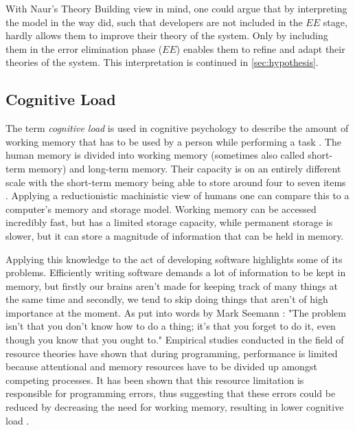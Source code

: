With Naur's Theory Building view in mind, one could argue that by interpreting the model in the way \citeauthor{northover_agile_2007} did, such that developers are not included in the $EE$ stage, hardly allows them to improve their theory of the system.
Only by including them in the error elimination phase ($EE$) enables them to refine and adapt their theories of the system.
This interpretation is continued in \ref{sec:hypothesis}.


\subsection{Cognitive Load}
\label{sec:cognitive-load}
The term \emph{cognitive load} is used in cognitive psychology to describe the amount of working memory that has to be used by a person while performing a task \cite{shaw_memory_2016}.
The human memory is divided into working memory (sometimes also called short-term memory) and long-term memory.
Their capacity is on an entirely different scale \cite{seemann_code_2021} with the short-term memory being able to store around four to seven items \cite{shaw_memory_2016}.
Applying a reductionistic machinistic view of humans one can compare this to a computer's memory and storage model.
Working memory can be accessed incredibly fast, but has a limited storage capacity, while permanent storage is slower, but it can store a magnitude of information that can be held in memory.

Applying this knowledge to the act of developing software highlights some of its problems.
Efficiently writing software demands a lot of information to be kept in memory, but firstly our brains aren't made for keeping track of many things at the same time and secondly, we tend to skip doing things that aren't of high importance at the moment.
As put into words by Mark Seemann \cite{seemann_code_2021}: "The problem isn't that you don't know how to do a thing; it's that you forget to do it, even though you know that you ought to."
Empirical studies conducted in the field of resource theories \cite{ormerod_human_1990} have shown that during programming, performance is limited because attentional and memory resources have to be divided up amongst competing processes.
It has been shown that this resource limitation is responsible for programming errors, thus suggesting that these errors could be reduced by decreasing the need for working memory, resulting in lower cognitive load \cite{ormerod_human_1990}.

